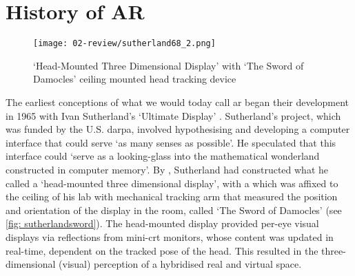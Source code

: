 \section{History of AR}\label{sec: ar-history}
\begin{wrapfigure}{r}{0.45\textwidth}
    \vspace{-\intextsep}
    \hfill
    \begin{minipage}{0.95\linewidth}
        \texttt{[image: 02-review/sutherland68\_2.png]}
        \captionsetup{justification=justified}
        \caption{`Head-Mounted Three Dimensional Display' with `The Sword of Damocles' ceiling mounted head tracking device \citep[in][]{sutherland1968}}\label{fig: sutherlandsword}
    \end{minipage}
\end{wrapfigure}
The earliest conceptions of what we would today call \gls{ar} began their development in 1965 with Ivan Sutherland's `Ultimate Display' \citeyearpar{sutherland1965}. Sutherland's project, which was funded by the U.S. \gls{darpa}, involved hypothesising and developing a computer interface that could serve `as many senses as possible'. He speculated that this interface could `serve as a looking-glass into the mathematical wonderland constructed in computer memory'. By \citeyear{sutherland1968}, Sutherland had constructed what he called a `head-mounted three dimensional display', with a which was affixed to the ceiling of his lab with mechanical tracking arm that measured the position and orientation of the display in the room, called `The Sword of Damocles' (see \autoref{fig: sutherlandsword}). The head-mounted display provided per-eye visual displays via reflections from mini-\gls{crt} monitors, whose content was updated in real-time, dependent on the tracked pose of the head. This resulted in the three-dimensional (visual) perception of a hybridised real and virtual space.


